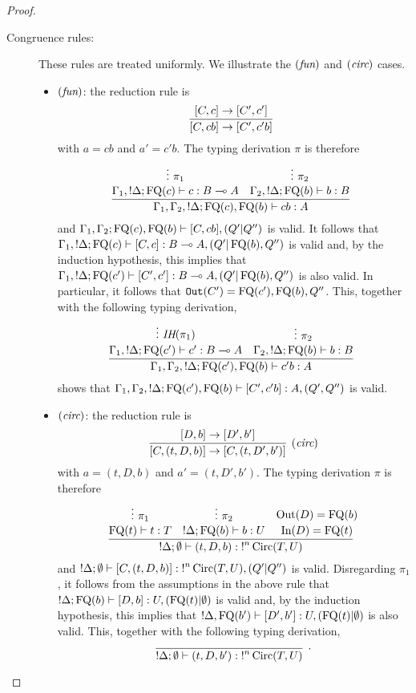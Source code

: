 \documentclass[twoside]{article}
\begin{document}
\begin{proof}
\begin{description}
\item[Congruence rules:] These rules are treated uniformly. We illustrate the 
$(\textit{fun})$ and $(\textit{circ})$ cases.
\begin{itemize}
  \item $(\textit{fun})$: the reduction rule is
  \[
    \infer[]{[C,cb]\to[C',c'b]}{
      [C,c]\to[C',c']
    }
  \]
  with $a=cb$ and $a'=c'b$. The typing derivation $\pi$ is therefore
  \[
    \infer[]{\Gamma_1,\Gamma_2, {!}\Delta;\FQ(c),\FQ(b)\entails cb:A}{
      \deduce[]{\Gamma_1, {!}\Delta;\FQ(c)\entails c:B\loli A}{
        \vdots~\pi_1
      } 
      &
      \deduce[]{\Gamma_2, {!}\Delta ;\FQ(b)\entails b:B}{
        \vdots~\pi_2
      } 
    }
  \]
  and $\Gamma_1,\Gamma_2;\mathop{\textrm{FQ}}\nolimits(c),\mathop{\textrm{FQ}}\nolimits(b)\vdash [C, cb],(Q'|Q'')$ is valid.
  It follows that $\Gamma_1, {!}\Delta;\mathop{\textrm{FQ}}\nolimits(c)\vdash [C,c]:B\multimap A,(Q'|\mathop{\textrm{FQ}}\nolimits(b),Q'')$ 
  is valid and, by the induction hypothesis, this implies that 
  $\Gamma_1, {!}\Delta;\mathop{\textrm{FQ}}\nolimits(c')\vdash [C',c']:B\multimap A,(Q'|\mathop{\textrm{FQ}}\nolimits(b),Q'')$ is also valid.
  In particular, it follows that $\mathtt{Out}(C')=\mathop{\textrm{FQ}}\nolimits(c'),\mathop{\textrm{FQ}}\nolimits(b),Q''$. This, 
  together with the following typing derivation,
  \[
    \infer[]{\Gamma_1,\Gamma_2, {!}\Delta;\FQ(c'),\FQ(b)\entails c'b:A}{
      \deduce[]{\Gamma_1, {!}\Delta;\FQ(c')\entails c':B\loli A}{
        \vdots~\IH(\pi_1)
      } 
      &
      \deduce[]{\Gamma_2, {!}\Delta ;\FQ(b)\entails b:B}{
        \vdots~\pi_2
      } 
    }
  \]  
  shows that $\Gamma_1,\Gamma_2, {!}\Delta;\mathop{\textrm{FQ}}\nolimits(c'),\mathop{\textrm{FQ}}\nolimits(b)\vdash [C',c'b]:A,(Q',Q'')$ 
  is valid.
  \item $(\textit{circ})$: the reduction rule is
  \[
    \infer[(\rul{circ})]{[C, (t,D,b)]\to [C, (t,D',b')]}{
      [D,b]\to [D',b']
    }
  \]  
  with $a=(t,D,b)$ and $a'=(t,D',b')$. The typing derivation $\pi$ is therefore
  \[
  \infer[]{{!}\Delta;\emptyset\entails (t,D,b):{!}^n\Circ(T,U)}{
    \deduce[]{\FQ(t)\entails t:T}{
      \vdots~\pi_1
    } 
    &
    \deduce[]{{!}\Delta ; \FQ(b)\entails b:U}{
      \vdots~\pi_2
    }
    &
    \deduce[]{\In(D)=\FQ(t)}{
      \Out(D)=\FQ(b)
    }
  }
  \]  
  and ${!}\Delta ; \emptyset \vdash [C,(t,D,b)]:{!}^n\mathop{\textrm{Circ}}\nolimits(T,U),(Q'|Q'')$ is valid. 
  Disregarding $\pi_1$, it follows from the assumptions in the above rule 
  that ${!}\Delta ; \mathop{\textrm{FQ}}\nolimits(b)\vdash [D,b]:U, (\mathop{\textrm{FQ}}\nolimits(t)|\emptyset)$ is valid and, 
  by the induction hypothesis, this implies that 
  ${!}\Delta,\mathop{\textrm{FQ}}\nolimits(b')\vdash [D',b']:U,(\mathop{\textrm{FQ}}\nolimits(t)|\emptyset)$ is also valid.
  This, together with the following typing derivation,
  \[
  \infer[.]{{!}\Delta;\emptyset\entails (t,D,b'):{!}^n\Circ(T,U)}{
}\]
\end{itemize}
\end{description}
\end{proof}
\end{document}
